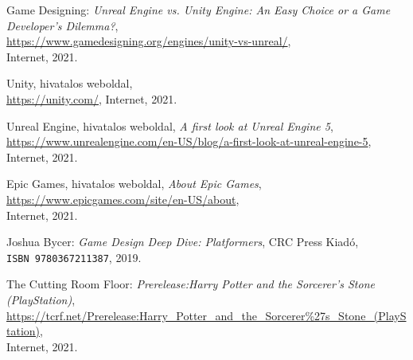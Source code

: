 \begin{thebibliography}{x}
	Game Designing: \emph{Unreal Engine vs. Unity Engine: An Easy Choice or a Game Developer’s Dilemma?}, \\
	\url{https://www.gamedesigning.org/engines/unity-vs-unreal/}, \\
	Internet, 2021.
	
	Unity, hivatalos weboldal, \\
	\url{https://unity.com/},
	Internet, 2021.
	
	
	
	Unreal Engine, hivatalos weboldal, \emph{A first look at Unreal Engine 5}, \\
	\url{https://www.unrealengine.com/en-US/blog/a-first-look-at-unreal-engine-5},
	Internet, 2021.
	
	Epic Games, hivatalos weboldal, \emph{About Epic Games}, \\
	\url{https://www.epicgames.com/site/en-US/about}, \\
	Internet, 2021.
	
	
	Joshua Bycer: \emph{Game Design Deep Dive: Platformers},
	CRC Press Kiadó, \\
	\texttt{ISBN 9780367211387}, 2019.
	
	The Cutting Room Floor: \emph{Prerelease:Harry Potter and the Sorcerer's Stone (PlayStation)}, \\
	\url{https://tcrf.net/Prerelease:Harry_Potter_and_the_Sorcerer\%27s_Stone_(PlayStation)}, \\
	Internet, 2021.
	

\end{thebibliography}

